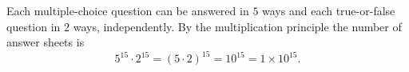 Each multiple-choice question can be answered in $5$ ways and each true-or-false question in $2$ ways, independently. By the multiplication principle the number of answer sheets is
\[
5^{15}\cdot2^{15}=(5\cdot2)^{15}=10^{15}=\boxed{1\times10^{15}} .
\]
